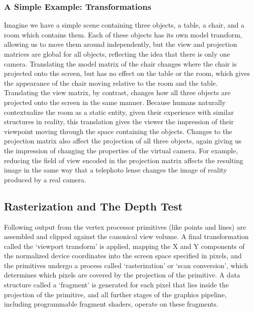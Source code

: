 \subsubsection{A Simple Example: Transformations}

Imagine we have a simple scene containing three objects, a table, a chair, and a room which contains them. Each of these objects has its own model transform, allowing us to move them around independently, but the view and projection matrices are global for all objects, reflecting the idea that there is only one camera. Translating the model matrix of the chair changes where the chair is projected onto the screen, but has no effect on the table or the room, which gives the appearance of the chair moving relative to the room and the table. Translating the view matrix, by contrast, changes how all three objects are projected onto the screen in the same manner. Because humans naturally contextualize the room as a static entity, given their experience with similar structures in reality, this translation gives the viewer the impression of their viewpoint moving through the space containing the objects. Changes to the projection matrix also affect the projection of all three objects, again giving us the impression of changing the properties of the virtual camera. For example, reducing the field of view encoded in the projection matrix affects the resulting image in the same way that a telephoto lense changes the image of reality produced by a real camera. 

\subsection{Rasterization and The Depth Test}
\label{sec:depth-test}
Following output from the vertex processor primitives (like points and lines) are assembled and clipped against the canonical view volume. A final transformation called the ‘viewport transform’ is applied, mapping the X and Y components of the normalized device coordinates into the screen space specified in pixels, and the primitives undergo a process called ‘rasterization’ or ‘scan conversion’, which determines which pixels are covered by the projection of the primitive. A data structure called a ‘fragment’ is generated for each pixel that lies inside the projection of the primitive, and all further stages of the graphics pipeline, including programmable fragment shaders, operate on these fragments. 


